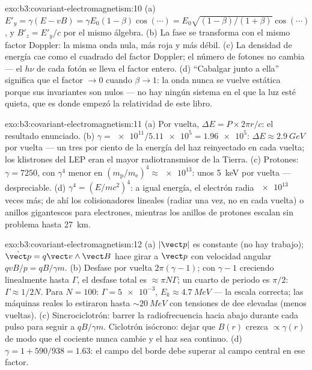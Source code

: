\begin{solution}{exo:b3:covariant-electromagnetism:10}
(a) $E'_y = \gamma(E - vB) = \gamma E_0(1 - \beta)\cos(\cdots) =
E_0\sqrt{(1-\beta)/(1+\beta)}\cos(\cdots)$, y $B'_z = E'_y/c$ por
el mismo álgebra. (b) La fase se transforma con el mismo factor
Doppler: la misma onda nula, más roja y más débil. (c) La densidad de
energía cae como el cuadrado del factor Doppler; el número de fotones no
cambia --- el $h\nu$ de cada fotón se lleva el factor entero. (d)
``Cabalgar junto a ella'' significa que el factor $\to 0$ cuando
$\beta \to 1$: la onda nunca se vuelve estática porque sus invariantes son
nulos --- no hay ningún sistema en el que la luz esté quieta, que es donde
empezó la relatividad de este libro.
\end{solution}

\begin{solution}{exo:b3:covariant-electromagnetism:11}
(a) Por vuelta, $\Delta E = P \times 2\pi r/c$: el resultado enunciado. (b)
$\gamma = \num{e11}/\num{5.11e5} = \num{1.96e5}$: $\Delta E \approx
\qty{2.9}{GeV}$ por vuelta --- un tres por ciento de la energía del haz
reinyectado en cada vuelta; los klistrones del LEP eran el mayor
radiotransmisor de la Tierra. (c) Protones: $\gamma = 7250$, con $\gamma^4$
menor en $(m_{\text{p}}/m_{\text{e}})^4 \approx \num{e13}$: unos
\qty{5}{keV} por vuelta --- despreciable. (d) $\gamma^4 = (E/mc^2)^4$:
a igual energía, el electrón radia $\num{e13}$ veces más; de ahí los
colisionadores lineales (radiar una vez, no en cada vuelta) o anillos
gigantescos para electrones, mientras los anillos de protones escalan sin
problema hasta \qty{27}{km}.
\end{solution}

\begin{solution}{exo:b3:covariant-electromagnetism:12}
(a) $|\vect p|$ es constante (no hay trabajo); $\dot{\vect p} = q\vect
v\wedge\vect B$ hace girar a $\vect p$ con velocidad angular $qvB/p = qB/\gamma m$. (b)
Desfase por vuelta $2\pi(\gamma - 1)$; con $\gamma - 1$ creciendo
linealmente hasta $\Gamma$, el desfase total es $\approx \pi N\Gamma$; un
cuarto de periodo es $\pi/2$: $\Gamma \approx 1/2N$. Para $N = 100$: $\Gamma =
\num{5e-3}$, $E_k \approx \qty{4.7}{MeV}$ --- la escala correcta; las
máquinas reales lo estiraron hasta $\sim\qty{20}{MeV}$ con tensiones de dee
elevadas (menos vueltas). (c) Sincrociclotrón: barrer la radiofrecuencia
hacia abajo durante cada pulso para seguir a $qB/\gamma m$. Ciclotrón
isócrono: dejar que $B(r)$ crezca $\propto\gamma(r)$ de modo que el cociente
nunca cambie y el haz sea continuo. (d) $\gamma = 1 + 590/938 = 1.63$: el
campo del borde debe superar al campo central en ese factor.
\end{solution}

